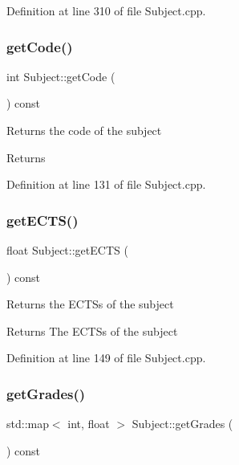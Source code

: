 Definition at line 310 of file Subject.\+cpp.

\mbox{\label{classSubject_a2d962550a5b15b5cdf3eb0d8892957f8}} 
\subsubsection{\texorpdfstring{get\+Code()}{getCode()}}
{\footnotesize\ttfamily int Subject\+::get\+Code (\begin{DoxyParamCaption}{ }\end{DoxyParamCaption}) const}

Returns the code of the subject \begin{DoxyReturn}{Returns}

\end{DoxyReturn}


Definition at line 131 of file Subject.\+cpp.

\mbox{\label{classSubject_a1395a7f637471df28cc72b8b746350d1}} 
\subsubsection{\texorpdfstring{get\+E\+C\+T\+S()}{getECTS()}}
{\footnotesize\ttfamily float Subject\+::get\+E\+C\+TS (\begin{DoxyParamCaption}{ }\end{DoxyParamCaption}) const}

Returns the E\+C\+T\+Ss of the subject \begin{DoxyReturn}{Returns}
The E\+C\+T\+Ss of the subject 
\end{DoxyReturn}


Definition at line 149 of file Subject.\+cpp.

\mbox{\label{classSubject_ac9837d37f7d4e94759622e736a5b4ff9}} 
\subsubsection{\texorpdfstring{get\+Grades()}{getGrades()}}
{\footnotesize\ttfamily std\+::map$<$ int, float $>$ Subject\+::get\+Grades (\begin{DoxyParamCaption}{ }\end{DoxyParamCaption}) const}

